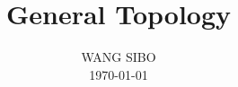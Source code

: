 \documentclass[multixcb, 14pt]{class/amstext-l}
\theoremstyle{plain}
\theoremstyle{definition}
\begin{document}
\frontmatter

\makeatletter

\makeatother

\title{General Topology}
\author{WANG SIBO\\ \today}

\maketitle

\tableofcontents

\mainmatter










\end{document}
